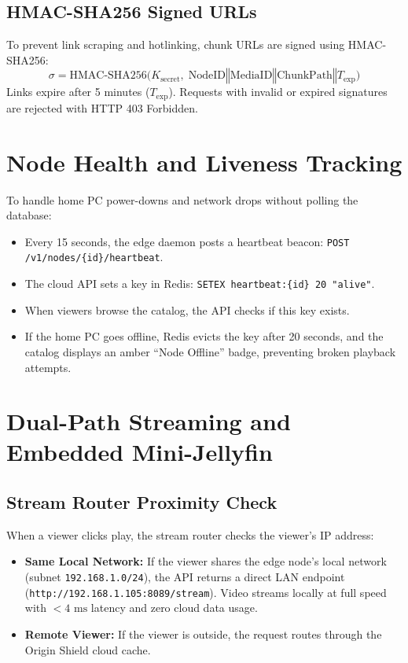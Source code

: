\subsection{HMAC-SHA256 Signed URLs}
To prevent link scraping and hotlinking, chunk URLs are signed using HMAC-SHA256:
\begin{equation}
    \sigma = \text{HMAC-SHA256}\Big(K_{\text{secret}}, \; \text{NodeID} \mathbin{\Vert} \text{MediaID} \mathbin{\Vert} \text{ChunkPath} \mathbin{\Vert} T_{\text{exp}}\Big)
\end{equation}
Links expire after 5 minutes ($T_{\text{exp}}$). Requests with invalid or expired signatures are rejected with HTTP 403 Forbidden.

\section{Node Health and Liveness Tracking}
\label{sec:feat_heartbeat}

To handle home PC power-downs and network drops without polling the database:
\begin{itemize}
    \item Every 15 seconds, the edge daemon posts a heartbeat beacon: \nolinkurl{POST /v1/nodes/{id}/heartbeat}.
    \item The cloud API sets a key in Redis: \texttt{SETEX heartbeat:\{id\} 20 "alive"}.
    \item When viewers browse the catalog, the API checks if this key exists.
    \item If the home PC goes offline, Redis evicts the key after 20 seconds, and the catalog displays an amber ``Node Offline'' badge, preventing broken playback attempts.
\end{itemize}

\section{Dual-Path Streaming and Embedded Mini-Jellyfin}
\label{sec:feat_dual_path}

\subsection{Stream Router Proximity Check}
When a viewer clicks play, the stream router checks the viewer's IP address:
\begin{itemize}
    \item \textbf{Same Local Network:} If the viewer shares the edge node's local network (subnet \texttt{192.168.1.0/24}), the API returns a direct LAN endpoint (\nolinkurl{http://192.168.1.105:8089/stream}). Video streams locally at full speed with $< 4\text{ ms}$ latency and zero cloud data usage.
    \item \textbf{Remote Viewer:} If the viewer is outside, the request routes through the Origin Shield cloud cache.
\end{itemize}

